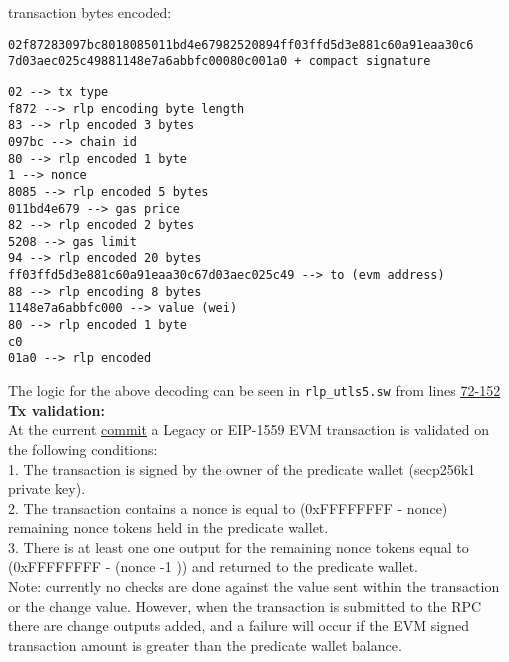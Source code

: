 transaction bytes encoded:\\
\begin{small}
    \begin{verbatim}
02f87283097bc8018085011bd4e67982520894ff03ffd5d3e881c60a91eaa30c6
7d03aec025c49881148e7a6abbfc00080c001a0 + compact signature
    \end{verbatim}
\end{small}


\begin{small}
\begin{verbatim}
02 --> tx type
f872 --> rlp encoding byte length
83 --> rlp encoded 3 bytes
097bc --> chain id
80 --> rlp encoded 1 byte
1 --> nonce
8085 --> rlp encoded 5 bytes
011bd4e679 --> gas price
82 --> rlp encoded 2 bytes
5208 --> gas limit
94 --> rlp encoded 20 bytes
ff03ffd5d3e881c60a91eaa30c67d03aec025c49 --> to (evm address)
88 --> rlp encoding 8 bytes
1148e7a6abbfc000 --> value (wei)
80 --> rlp encoded 1 byte
c0
01a0 --> rlp encoded
\end{verbatim}
\end{small}

The logic for the above decoding can be seen in \texttt{rlp\_utls5.sw} from lines \href{https://github.com/Layer3Labs/zap-contracts/blob/9b2e0b8229077ef8becd6af0ad1a91f810a8db0a/contracts/wallet_predicate/src/rlp_utils5.sw#L72-L152}{\uline{72-152}}\\


\textbf{Tx validation:} \\

At the current \href{https://github.com/Layer3Labs/zap-contracts/commit/0e50f07c9350bb790d3a19d5302acd3ce96d310f}{\uline{commit}} a Legacy or EIP-1559 EVM transaction
is validated on the following conditions:\\

1. The transaction is signed by the owner of the predicate wallet (secp256k1 private key).\\
2. The transaction contains a nonce is equal to (0xFFFFFFFF - nonce) remaining nonce tokens held in the predicate wallet. \\
3. There is at least one one output for the remaining nonce tokens equal to (0xFFFFFFFF - (nonce -1 )) and returned to the predicate wallet.\\

Note: currently no checks are done against the value sent within the transaction or the change value. However, when the transaction is submitted to the RPC there
are change outputs added, and a failure will occur if the EVM signed transaction amount is greater than the predicate wallet balance.\



